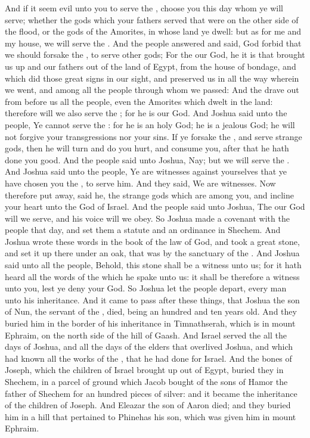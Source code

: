\begin{biblechapter}
\verse And if it seem evil unto you to serve the \LORD, choose you this day whom ye will serve; whether the gods which your fathers served that were on the other side of the flood, or the gods of the Amorites, in whose land ye dwell: but as for me and my house, we will serve the \LORD.
\verse And the people answered and said, God forbid that we should forsake the \LORD, to serve other gods;
\verse For the \LORD our God, he it is that brought us up and our fathers out of the land of Egypt, from the house of bondage, and which did those great signs in our sight, and preserved us in all the way wherein we went, and among all the people through whom we passed:
\verse And the \LORD drave out from before us all the people, even the Amorites which dwelt in the land: therefore will we also serve the \LORD; for he is our God.
\verse And Joshua said unto the people, Ye cannot serve the \LORD: for he is an holy God; he is a jealous God; he will not forgive your transgressions nor your sins.
\verse If ye forsake the \LORD, and serve strange gods, then he will turn and do you hurt, and consume you, after that he hath done you good.
\verse And the people said unto Joshua, Nay; but we will serve the \LORD.
\verse And Joshua said unto the people, Ye are witnesses against yourselves that ye have chosen you the \LORD, to serve him. And they said, We are witnesses.
\verse Now therefore put away, said he, the strange gods which are among you, and incline your heart unto the \LORD God of Israel.
\verse And the people said unto Joshua, The \LORD our God will we serve, and his voice will we obey.
\verse So Joshua made a covenant with the people that day, and set them a statute and an ordinance in Shechem.
\verse And Joshua wrote these words in the book of the law of God, and took a great stone, and set it up there under an oak, that was by the sanctuary of the \LORD.
\verse And Joshua said unto all the people, Behold, this stone shall be a witness unto us; for it hath heard all the words of the \LORD which he spake unto us: it shall be therefore a witness unto you, lest ye deny your God.
\verse So Joshua let the people depart, every man unto his inheritance.
 And it came to pass after these things, that Joshua the son of Nun, the servant of the \LORD, died, being an hundred and ten years old.
\verse And they buried him in the border of his inheritance in Timnathserah, which is in mount Ephraim, on the north side of the hill of Gaash.
\verse And Israel served the \LORD all the days of Joshua, and all the days of the elders that overlived Joshua, and which had known all the works of the \LORD, that he had done for Israel.
\verse And the bones of Joseph, which the children of Israel brought up out of Egypt, buried they in Shechem, in a parcel of ground which Jacob bought of the sons of Hamor the father of Shechem for an hundred pieces of silver: and it became the inheritance of the children of Joseph.
\verse And Eleazar the son of Aaron died; and they buried him in a hill that pertained to Phinehas his son, which was given him in mount Ephraim.
\end{biblechapter}
